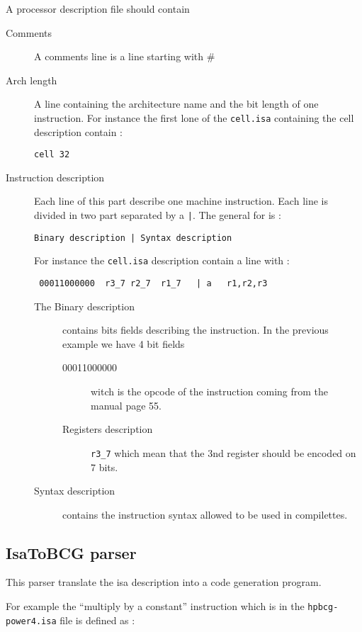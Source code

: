 \documentclass{article}
\begin{document}
A processor description file should contain
\begin{description}
\item[Comments] A comments line is a line starting with \#
\item[Arch length] A line containing the architecture name and the bit
  length of one instruction. For instance the first lone of the 
\verb|cell.isa| containing the cell description contain :
\begin{verbatim}
cell 32
\end{verbatim}
\item[Instruction description] Each line of this part describe one
  machine instruction. Each line is divided in two part separated by a
  \verb-|-. The general for is :

\begin{verbatim}
Binary description | Syntax description
\end{verbatim}

For instance the \verb|cell.isa| description contain a line with :
\begin{verbatim}
 00011000000  r3_7 r2_7  r1_7   | a   r1,r2,r3
\end{verbatim}
  \begin{description}
  \item[The Binary description] contains bits fields describing the
    instruction. In the previous example we have 4 bit fields
    \begin{description}
      \item[00011000000] witch is the opcode of the instruction
        coming from the manual\cite{SPU1} page 55.
      \item[Registers description] \verb|r3_7| which mean that the 3nd
        register should be encoded on 7 bits.
    \end{description}
  \item[Syntax description] contains the instruction syntax allowed to
    be used in compilettes.
  \end{description}

\end{description}

\subsection{IsaToBCG parser}

This parser translate the isa description into a code generation
program.

For example the ``multiply by a constant'' instruction which is in the
\texttt{hpbcg-power4.isa} file is defined as :
\end{document}
